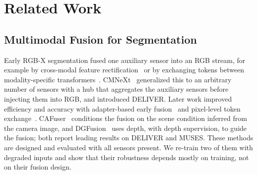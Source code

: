 \section{Related Work}\label{sec:related}

\subsection{Multimodal Fusion for Segmentation}
Early RGB-X segmentation fused one auxiliary sensor into an RGB stream, for example by cross-modal feature rectification~\cite{cmx2023} or by exchanging tokens between modality-specific transformers~\cite{tokenfusion2022}. CMNeXt~\cite{cmnext2023} generalized this to an arbitrary number of sensors with a hub that aggregates the auxiliary sensors before injecting them into RGB, and introduced DELIVER. Later work improved efficiency and accuracy with adapter-based early fusion~\cite{stitchfusion2024} and pixel-level token exchange~\cite{geminifusion2024}. CAFuser~\cite{cafuser2025} conditions the fusion on the scene condition inferred from the camera image, and DGFusion~\cite{dgfusion2026} uses depth, with depth supervision, to guide the fusion; both report leading results on DELIVER and MUSES. These methods are designed and evaluated with all sensors present. We re-train two of them with degraded inputs and show that their robustness depends mostly on training, not on their fusion design.

